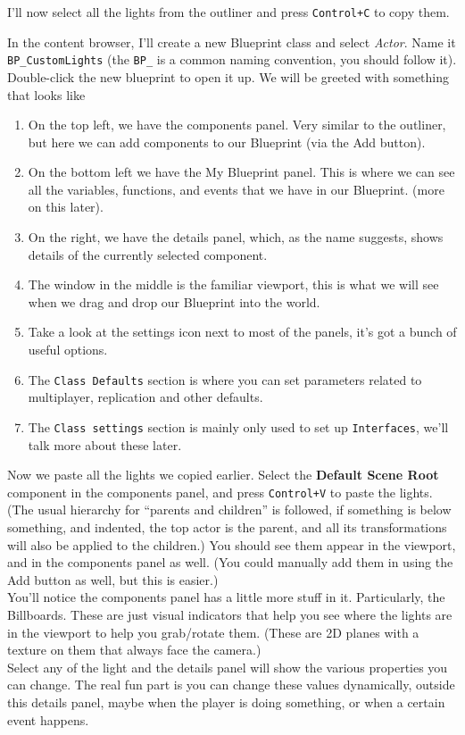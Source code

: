 \documentclass{article}
\begin{document}

I'll now select all the lights from the outliner and press \verb|Control+C| to copy them.

In the content browser, I'll create a new Blueprint class and select \emph{Actor}. Name it \verb|BP_CustomLights| (the \verb|BP_| is a common naming convention, you should follow it). Double-click the new blueprint to open it up.
\newpage
We will be greeted with something that looks like

\begin{enumerate}
    \item On the top left, we have the components panel. Very similar to the outliner, but here we can add components to our Blueprint (via the Add button).
    \item On the bottom left we have the My Blueprint panel. This is where we can see all the variables, functions, and events that we have in our Blueprint. (more on this later).
    \item On the right, we have the details panel, which, as the name suggests, shows details of the currently selected component. 
    \item The window in the middle is the familiar viewport, this is what we will see when we drag and drop our Blueprint into the world.
    \item Take a look at the settings icon next to most of the panels, it's got a bunch of useful options.
    \item The \verb|Class Defaults| section is where you can set parameters related to multiplayer, replication and other defaults.
    \item The \verb|Class settings| section is mainly only used to set up \verb|Interfaces|, we'll talk more about these later.
\end{enumerate}
Now we paste all the lights we copied earlier. Select the \textbf{Default Scene Root} component in the components panel, and press \verb|Control+V| to paste the lights. (The usual hierarchy for ``parents and children'' is followed, if something is below something, and indented, the top actor is the parent, and all its transformations will also be applied to the children.)
You should see them appear in the viewport, and in the components panel as well. (You could manually add them in using the Add button as well, but this is easier.)\\[10pt]
You'll notice the components panel has a little more stuff in it. Particularly, the Billboards. These are just visual indicators that help you see where the lights are in the viewport to help you grab/rotate them. (These are 2D planes with a texture on them that always face the camera.)\\[10pt]
Select any of the light and the details panel will show the various properties you can change. The real fun part is you can change these values dynamically, outside this details panel, maybe when the player is doing something, or when a certain event happens.
\end{document}
